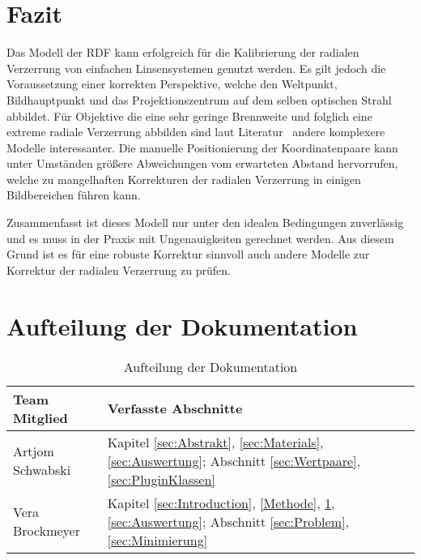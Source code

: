 \section{Fazit} \label{sec:Conclusion}
Das Modell der RDF kann erfolgreich für die Kalibrierung der radialen Verzerrung von einfachen Linsensystemen genutzt werden. Es gilt jedoch die Voraussetzung einer korrekten Perspektive, welche den Weltpunkt, Bildhauptpunkt und das Projektionszentrum auf dem selben optischen Strahl abbildet. Für Objektive die eine sehr geringe Brennweite und folglich eine extreme radiale Verzerrung abbilden sind laut Literatur~\cite{WangRaddist} andere komplexere Modelle interessanter. Die manuelle Positionierung der Koordinatenpaare kann unter Umständen größere Abweichungen vom erwarteten Abstand hervorrufen, welche zu mangelhaften Korrekturen der radialen Verzerrung in einigen Bildbereichen führen kann. 

Zusammenfasst ist dieses Modell nur unter den idealen Bedingungen zuverlässig und es muss in der Praxis mit Ungenauigkeiten gerechnet werden. Aus diesem Grund ist es für eine robuste Korrektur sinnvoll auch andere Modelle zur Korrektur der radialen Verzerrung zu prüfen.
\section{Aufteilung der Dokumentation}
\begin{table}[H]
		\begin{tabular}{|p{} | p{}|} 
			\hline
			\textbf{Team Mitglied} & \textbf{Verfasste Abschnitte}\\ \hline
			Artjom Schwabski& Kapitel \ref{sec:Abstrakt}, \ref{sec:Materials}, \ref{sec:Auswertung}; Abschnitt \ref{sec:Wertpaare}, \ref{sec:PluginKlassen} \\ \hline
			Vera Brockmeyer & Kapitel \ref{sec:Introduction}, \ref{Methode}, \ref{sec:Conclusion}, \ref{sec:Auswertung}; Abschnitt \ref{sec:Problem}, \ref{sec:Minimierung} \\ \hline
		\end{tabular}
		\caption{Aufteilung der Dokumentation}
\end{table}


























